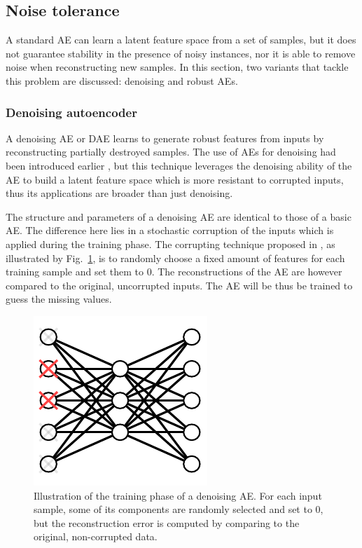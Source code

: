 \subsection{Noise tolerance}\label{Sec.NoiseTolerance}

A standard AE can learn a latent feature space from a set of samples, but it does not guarantee stability in the presence of noisy instances, nor it is able to remove noise when reconstructing new samples. In this section, two variants that tackle this problem are discussed: denoising and robust AEs.

\subsubsection{Denoising autoencoder}

A denoising AE or DAE \cite{vincent_denoising_2008} learns to generate robust features from inputs by reconstructing partially destroyed samples. The use of AEs for denoising had been introduced earlier \cite{yann1987modeles}, but this technique leverages the denoising ability of the AE to build a latent feature space which is more resistant to corrupted inputs, thus its applications are broader than just denoising. 

The structure and parameters of a denoising AE are identical to those of a basic AE. The difference here lies in a stochastic corruption of the inputs which is applied during the training phase. The corrupting technique proposed in \cite{vincent_denoising_2008}, as illustrated by Fig.~\ref{Fig.Denoising}, is to randomly choose a fixed amount of features for each training sample and set them to 0. The reconstructions of the AE are however compared to the original, uncorrupted inputs. The AE will be thus be trained to guess the missing values.

\begin{figure}[ht!]
	\centering
	\includegraphics[width=0.7\figwidth]{Denoising.pdf} 

	\caption{Illustration of the training phase of a denoising AE. For each input sample, some of its components are randomly selected and set to 0, but the reconstruction error is computed by comparing to the original, non-corrupted data.}
	\label{Fig.Denoising}
\end{figure}

